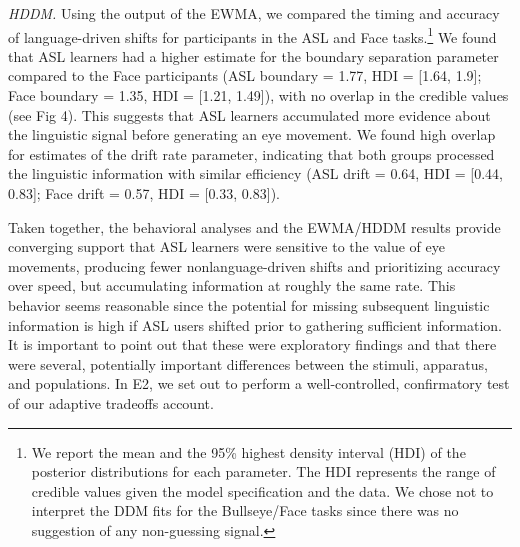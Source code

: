 \documentclass[10pt, letterpaper]{article}
\begin{document}
\emph{HDDM.} Using the output of the EWMA, we compared the timing and
accuracy of language-driven shifts for participants in the ASL and Face
tasks.\footnote{We report the mean and the 95\% highest density interval
  (HDI) of the posterior distributions for each parameter. The HDI
  represents the range of credible values given the model specification
  and the data. We chose not to interpret the DDM fits for the
  Bullseye/Face tasks since there was no suggestion of any non-guessing
  signal.} We found that ASL learners had a higher estimate for the
boundary separation parameter compared to the Face participants (ASL
boundary = 1.77, HDI = {[}1.64, 1.9{]}; Face boundary = 1.35, HDI =
{[}1.21, 1.49{]}), with no overlap in the credible values (see Fig 4).
This suggests that ASL learners accumulated more evidence about the
linguistic signal before generating an eye movement. We found high
overlap for estimates of the drift rate parameter, indicating that both
groups processed the linguistic information with similar efficiency (ASL
drift = 0.64, HDI = {[}0.44, 0.83{]}; Face drift = 0.57, HDI = {[}0.33,
0.83{]}).

Taken together, the behavioral analyses and the EWMA/HDDM results
provide converging support that ASL learners were sensitive to the value
of eye movements, producing fewer nonlanguage-driven shifts and
prioritizing accuracy over speed, but accumulating information at
roughly the same rate. This behavior seems reasonable since the
potential for missing subsequent linguistic information is high if ASL
users shifted prior to gathering sufficient information. It is important
to point out that these were exploratory findings and that there were
several, potentially important differences between the stimuli,
apparatus, and populations. In E2, we set out to perform a
well-controlled, confirmatory test of our adaptive tradeoffs account.
\end{document}

